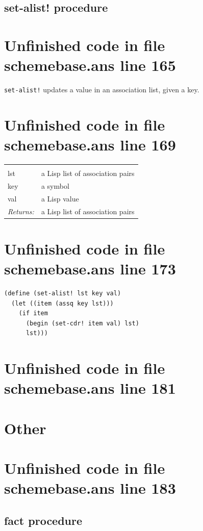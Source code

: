 \documentclass[twoside,9pt]{report}
\begin{document}
\subsection{set-alist! procedure}
\label{set-alist"!-procedure}
\section{Unfinished code in file schemebase.ans line 165}


\texttt{set-alist!} updates a value in an association list, given a key.

\section{Unfinished code in file schemebase.ans line 169}
\noindent\begin{tabular}{ |p{1.9cm} p{8cm}| }
\hline
\rowcolor[HTML]{CCCCCC} \multicolumn{2}{|l|}{\bf set-alist! (public)} \\
lst & a Lisp list of association pairs \\
key & a symbol \\
val & a Lisp value \\
\textit{Returns:} & a Lisp list of association pairs \\
\hline
\end{tabular}
\section{Unfinished code in file schemebase.ans line 173}
\begin{lstlisting}
(define (set-alist! lst key val)
  (let ((item (assq key lst)))
    (if item
      (begin (set-cdr! item val) lst)
      lst)))
\end{lstlisting}
\section{Unfinished code in file schemebase.ans line 181}
\section{Other}
\label{other}
\section{Unfinished code in file schemebase.ans line 183}
\subsection{fact procedure}
\label{fact-procedure}
\end{document}
